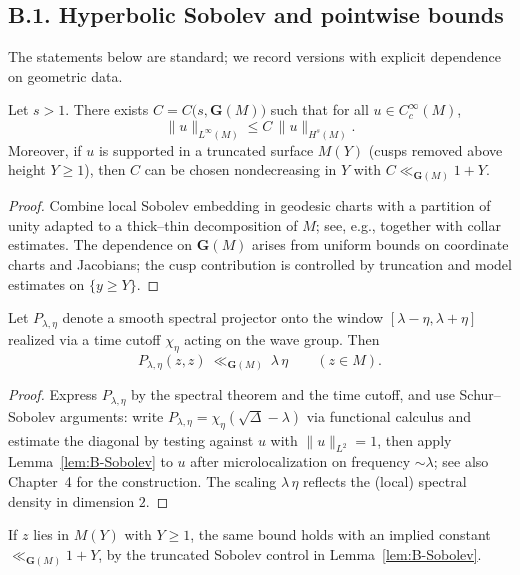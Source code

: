 \bigskip
\subsection*{B.1. Hyperbolic Sobolev and pointwise bounds}
\noindent The statements below are standard; we record versions with explicit dependence on geometric data.

\begin{lemma}\label{lem:B-Sobolev}
Let \(s>1\). There exists \(C=C\big(s,\mathbf{G}(M)\big)\) such that for all \(u\in C_c^\infty(M)\),
\[
\|u\|_{L^\infty(M)} \le C\,\|u\|_{H^{s}(M)}.
\]
Moreover, if \(u\) is supported in a truncated surface \(M(Y)\) (cusps removed above height \(Y\ge 1\)), then \(C\) can be chosen nondecreasing in \(Y\) with \(C\ll_{\mathbf{G}(M)} 1+Y\). 
\end{lemma}

\begin{proof}
Combine local Sobolev embedding in geodesic charts with a partition of unity adapted to a thick–thin decomposition of \(M\); see, e.g., \cite[Thm.~2.1]{Iwaniec2002} together with collar estimates. The dependence on \(\mathbf{G}(M)\) arises from uniform bounds on coordinate charts and Jacobians; the cusp contribution is controlled by truncation and model estimates on \(\{y\ge Y\}\).
\end{proof}

\begin{corollary}\label{cor:B-proj-ptwise}
Let \(P_{\lambda,\eta}\) denote a smooth spectral projector onto the window \([\lambda-\eta,\lambda+\eta]\) realized via a time cutoff \(\chi_\eta\) acting on the wave group. Then
\[
P_{\lambda,\eta}(z,z)\ \ll_{\mathbf{G}(M)}\ \lambda\,\eta\qquad (z\in M).
\]
\end{corollary}

\begin{proof}
Express \(P_{\lambda,\eta}\) by the spectral theorem and the time cutoff, and use Schur–Sobolev arguments: write \(P_{\lambda,\eta}=\chi_\eta(\sqrt{\Delta}-\lambda)\) via functional calculus and estimate the diagonal by testing against \(u\) with \(\|u\|_{L^2}=1\), then apply Lemma~\ref{lem:B-Sobolev} to \(u\) after microlocalization on frequency \(\sim\lambda\); see also Chapter~4 for the construction. The scaling \(\lambda\,\eta\) reflects the (local) spectral density in dimension \(2\).
\end{proof}

\begin{remark}\label{rem:B-trunc}
If \(z\) lies in \(M(Y)\) with \(Y\ge 1\), the same bound holds with an implied constant \(\ll_{\mathbf{G}(M)}1+Y\), by the truncated Sobolev control in Lemma~\ref{lem:B-Sobolev}.
\end{remark}


